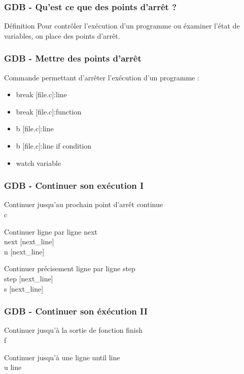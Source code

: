 \documentclass[8pt]{beamer}
\begin{document}
\begin{frame}
\frametitle{GDB - Qu'est ce que des points d'arrêt ?}

\begin{block}{Définition}
	Pour contrôler l'exécution d'un programme ou éxaminer l'état de variables, on place des points d'arrêt.
\end{block}

\end{frame}


\begin{frame}
\frametitle{GDB - Mettre des points d'arrêt}

Commande permettant d'arrêter l'exécution d'un programme :
\begin{itemize}
	\item break [file.c]:line
	\onslide<3->\item break [file.c]:function
	\onslide<4->\item b [file.c]:line
	\onslide<5->\item b [file.c]:line if condition
	\onslide<6->\item watch variable
\end{itemize}

\end{frame}


\begin{frame}
\frametitle{GDB - Continuer son exécution I}

\begin{block}{Continuer jusqu'au prochain point d'arrêt}
	continue\\
	c
\end{block}

\begin{block}{Continuer ligne par ligne}
	next\\
	next [next\_line]\\
	n [next\_line]
\end{block}

\begin{block}{Continuer précisement ligne par ligne}
	step\\
	step [next\_line]\\
	s [next\_line]\\
\end{block}

\end{frame}


\begin{frame}
\frametitle{GDB - Continuer son éxécution II}
    
\begin{block}{Continuer jusqu'à la sortie de fonction}
	finish\\
	f
\end{block}

\begin{block}{Continuer jusqu'à une ligne}
	until line\\
	u line
\end{block}

\end{frame}
\end{document}
